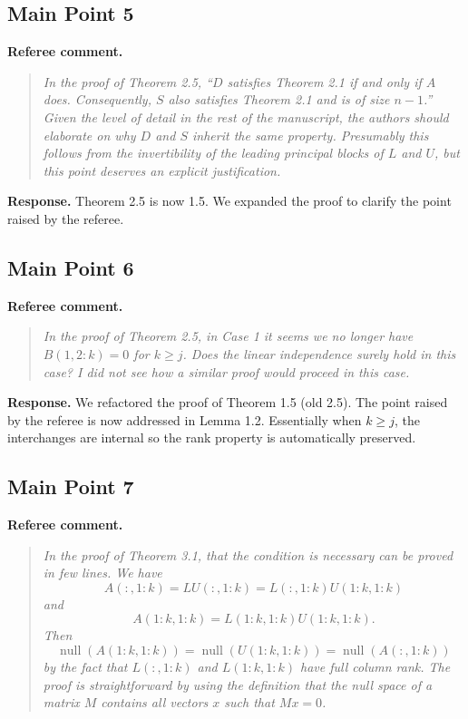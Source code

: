 \documentclass[11pt]{article}
\newenvironment{refereecomment}
{\par\smallskip\noindent\textbf{\color{commentblue}Referee comment.}
\begin{quote}\itshape}
  {
\end{quote}}
\newenvironment{authorresponse}
{\par\smallskip\noindent\textbf{\color{responsegreen}Response.}}
{\par\smallskip}
\begin{document}
\subsection*{Main Point 5}

\begin{refereecomment}
  In the proof of Theorem 2.5, “$D$ satisfies Theorem 2.1 if and only if $A$ does. Consequently, $S$ also satisfies Theorem 2.1 and is of size $n-1$.” Given the level of detail in the rest of the manuscript, the authors should elaborate on why $D$ and $S$ inherit the same property. Presumably this follows from the invertibility of the leading principal blocks of $L$ and $U$, but this point deserves an explicit justification.
\end{refereecomment}

\begin{authorresponse}
  Theorem 2.5 is now 1.5. We expanded the proof to clarify the point raised by the referee.
\end{authorresponse}

\subsection*{Main Point 6}

\begin{refereecomment}
  In the proof of Theorem 2.5, in Case 1 it seems we no longer have $B(1, 2 : k) = 0$ for $k \ge j$. Does the linear independence surely hold in this case? I did not see how a similar proof would proceed in this case.
\end{refereecomment}

\begin{authorresponse}
  We refactored the proof of Theorem 1.5 (old 2.5). The point raised by the referee is now addressed in Lemma 1.2. Essentially when $k \ge j$, the interchanges are internal so the rank property is automatically preserved.
\end{authorresponse}

\subsection*{Main Point 7}

\begin{refereecomment}
  In the proof of Theorem 3.1, that the condition is necessary can be proved in few lines. We have
  \[
    A(:,1:k) = LU(:,1:k) = L(:,1:k)U(1:k,1:k)
  \]
  and
  \[
    A(1:k,1:k) = L(1:k,1:k)U(1:k,1:k).
  \]
  Then
  \[
    \operatorname{null}(A(1:k,1:k)) = \operatorname{null}(U(1:k,1:k)) = \operatorname{null}(A(:,1:k))
  \]
  by the fact that $L(:,1:k)$ and $L(1:k,1:k)$ have full column rank. The proof is straightforward by using the definition that the null space of a matrix $M$ contains all vectors $x$ such that $Mx = 0$.
\end{refereecomment}
\end{document}
